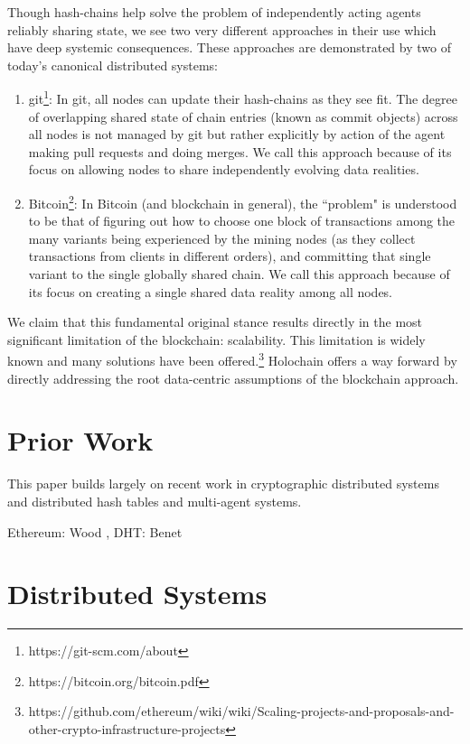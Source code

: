 \documentclass[twocolumn,showpacs,
  nofootinbib,aps,superscriptaddress,
  eqsecnum,prd,notitlepage,showkeys,10pt]{revtex4-1}
\begin{document}
Though hash-chains help solve the problem of independently acting agents reliably sharing state, we see two very different approaches in their use which have deep systemic consequences.  These approaches are demonstrated by two of today's canonical distributed systems: \begin{enumerate}
\item git\footnote{https://git-scm.com/about}:  In git, all nodes can update their hash-chains as they see fit.  The degree of overlapping shared state of chain entries (known as commit objects) across all nodes is not managed by git but rather explicitly by action of the agent making pull requests and doing merges.  We call this approach  because of its focus on allowing nodes to share independently evolving data realities.
\item Bitcoin\footnote{https://bitcoin.org/bitcoin.pdf}: In Bitcoin (and blockchain in general), the ``problem" is understood to be that of figuring out how to choose one block of transactions among the many variants being experienced by the mining nodes (as they collect transactions from clients in different orders), and committing that single variant to the single globally shared chain. We call this approach  because of its focus on creating a single shared data reality among all nodes.
\end{enumerate}

We claim that this fundamental original stance results directly in the most significant limitation of the blockchain: scalability.  This limitation is widely known and many solutions have been offered.\footnote{https://github.com/ethereum/wiki/wiki/Scaling-projects-and-proposals-and-other-crypto-infrastructure-projects}  Holochain offers a way forward by directly addressing the root data-centric assumptions of the blockchain approach.

\section{Prior Work}
This paper builds largely on recent work in cryptographic distributed systems and distributed hash tables and multi-agent systems.

Ethereum: Wood \cite{yellowpaper}, DHT: \cite{kademlia}  Benet \cite{ipfs}



\section{Distributed Systems}
\label{sec:data-centric-systems}
\end{document}
